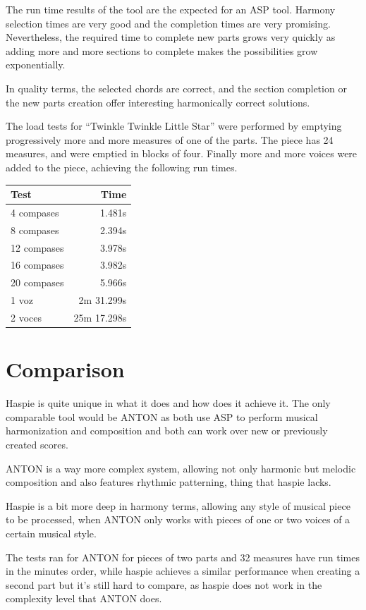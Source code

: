 The run time results of the tool are the expected for an ASP tool. Harmony selection times are very good and the completion times are very promising. Nevertheless, the required time to complete new parts grows very quickly as adding more and more sections to complete makes the possibilities grow exponentially.

In quality terms, the selected chords are correct, and the section completion or the new parts creation offer interesting harmonically correct solutions.

The load tests for  ``Twinkle Twinkle Little Star'' were performed by emptying progressively more and more measures of one of the parts. The piece has 24 measures, and were emptied in blocks of four. Finally more and more voices were added to the piece, achieving the following run times.
\begin{center}
	\begin{tabular}{ | l | r | }
		\hline
		Test & Time \\ \hline
		4 compases  & 1.481s \\ \hline
		8 compases 	& 2.394s \\ \hline
		12 compases	& 3.978s \\ \hline
		16 compases & 3.982s \\ \hline
		20 compases & 5.966s \\ \hline
		1 voz & 2m 31.299s \\ \hline
		2 voces & 25m 17.298s  \\ \hline
	\end{tabular}
\end{center}

\section{Comparison}
Haspie is quite unique in what it does and how does it achieve it. The only comparable tool would be ANTON \cite{anton-composing} as both use ASP to perform musical harmonization and composition and both can work over new or previously created scores.

ANTON is a way more complex system, allowing not only harmonic but melodic composition and also features rhythmic patterning, thing that haspie lacks.

Haspie is a bit more deep in harmony terms, allowing any style of musical piece to be processed, when ANTON only works with pieces of one or two voices of a certain musical style.

The tests ran for ANTON for pieces of two parts and 32 measures have run times in the minutes order, while haspie achieves a similar performance when creating a second part but it's still hard to compare, as haspie does not work in the complexity level that ANTON does.

